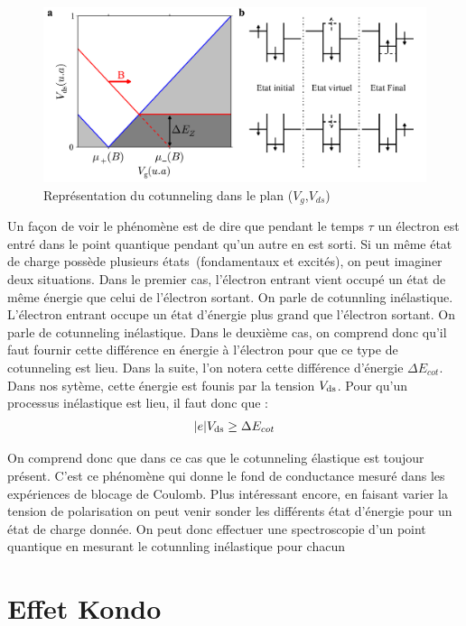 \begin{figure}
\includegraphics[scale=0.5]{Theorie/Transport/figure5/figure5.pdf} 
\caption{Représentation du cotunneling dans le plan ($V_g$,$V_{ds}$)}
\label{charge_discharge}
\end{figure}


Un façon de voir le phénomène est de dire que pendant le temps $\tau$ un électron est entré dans le point quantique pendant qu'un autre en est sorti. Si un m\^eme état de charge possède plusieurs états~(fondamentaux et excités), on peut imaginer deux situations. Dans le premier cas, l'électron entrant vient occupé un état de m\^eme énergie que celui de l'électron sortant. On parle de cotunnling inélastique. L'électron entrant occupe un état d'énergie plus grand que l'électron sortant. On parle de cotunneling inélastique. Dans le deuxième cas, on comprend donc qu'il faut fournir cette différence en énergie à l'électron pour que ce type de cotunneling est lieu. Dans la suite, l'on notera cette différence d'énergie $\Delta E_{cot}$. Dans nos sytème, cette énergie est founis par la tension $V_{\rm{ds}}$. Pour qu'un processus inélastique est lieu, il faut donc que :
\begin{eqnarray}
|e|V_{\rm{ds}} \geq \Delta E_{cot}
\end{eqnarray}

On comprend donc que dans ce cas que le cotunneling élastique est toujour présent. C'est ce phénomène qui donne le fond de conductance mesuré dans les expériences de blocage de Coulomb. Plus intéressant encore, en faisant varier la tension de polarisation on peut venir sonder les différents état d'énergie pour un état de charge donnée. On peut donc effectuer une spectroscopie d'un point quantique en mesurant le cotunnling inélastique pour chacun

\section{Effet Kondo}

